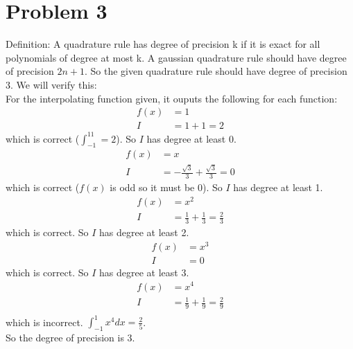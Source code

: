 \documentclass{article}
\begin{document}
\section*{Problem 3}
Definition: A quadrature rule has degree of precision k if it is exact for all polynomials of degree at most k. A gaussian quadrature rule should have degree of precision $2n + 1$. So the given quadrature rule should have degree of precision 3. We will verify this:\\
For the interpolating function given, it ouputs the following for each function: \\
\begin{align*}
f(x) &= 1\\
I &= 1 + 1 = 2
\end{align*}
which is correct ($\int_{-1}^11 = 2$). So $I$ has degree at least 0. \\
\begin{align*}
f(x) &= x \\
I &= -\frac{\sqrt{3}}{3} + \frac{\sqrt{3}}{3} = 0
\end{align*}
which is correct ($f(x)$ is odd so it must be 0). So $I$ has degree at least 1. \\
\begin{align*}
f(x) &= x^2 \\
I &= \frac{1}{3} + \frac{1}{3} = \frac{2}{3}
\end{align*}
which is correct. So $I$ has degree at least 2. \\
\begin{align*}
f(x) &= x^3 \\
I &= 0
\end{align*}
which is correct. So $I$ has degree at least 3. \\
\begin{align*}
f(x) &= x^4 \\
I &= \frac{1}{9} + \frac{1}{9} = \frac{2}{9} \\
\end{align*}
which is incorrect. $\int_{-1}^1x^4dx = \frac{2}{5}$. \\
So the degree of precision is 3.
\end{document}
